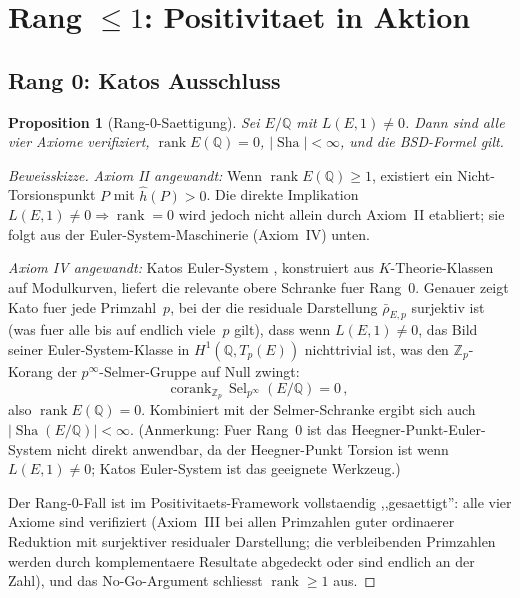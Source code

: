 \documentclass[aps,prd,twocolumn,superscriptaddress,nofootinbib]{revtex4-2}
\newtheorem{proposition}[theorem]{Proposition}
\theoremstyle{definition}
\theoremstyle{remark}
\DeclareMathOperator{\rank}{rank}
\DeclareMathOperator{\Sel}{Sel}
\DeclareMathOperator{\Sha}{Sha}
\begin{document}
\section{Rang $\leq 1$: Positivitaet in Aktion}
\label{sec:rank01}

\subsection{Rang 0: Katos Ausschluss}

\begin{proposition}[Rang-0-Saettigung]
\label{prop:rank0}
Sei $E/\mathbb{Q}$ mit $L(E,1) \neq 0$. Dann sind alle vier Axiome verifiziert, $\rank E(\mathbb{Q}) = 0$, $|\Sha| < \infty$, und die BSD-Formel gilt.
\end{proposition}

\begin{proof}[Beweisskizze]
\textit{Axiom II angewandt:} Wenn $\rank E(\mathbb{Q}) \geq 1$, existiert ein Nicht-Torsionspunkt $P$ mit $\hat{h}(P) > 0$. Die direkte Implikation $L(E,1) \neq 0 \Rightarrow \rank = 0$ wird jedoch nicht allein durch Axiom~II etabliert; sie folgt aus der Euler-System-Maschinerie (Axiom~IV) unten.

\textit{Axiom IV angewandt:} Katos Euler-System \cite{Kato2004}, konstruiert aus $K$-Theorie-Klassen auf Modulkurven, liefert die relevante obere Schranke fuer Rang~0. Genauer zeigt Kato fuer jede Primzahl~$p$, bei der die residuale Darstellung $\bar{\rho}_{E,p}$ surjektiv ist (was fuer alle bis auf endlich viele~$p$ gilt), dass wenn $L(E,1) \neq 0$, das Bild seiner Euler-System-Klasse in $H^1(\mathbb{Q}, T_p(E))$ nichttrivial ist, was den $\mathbb{Z}_p$-Korang der $p^\infty$-Selmer-Gruppe auf Null zwingt:
\begin{equation}
\mathrm{corank}_{\mathbb{Z}_p}\, \Sel_{p^\infty}(E/\mathbb{Q}) = 0\,,
\end{equation}
also $\rank E(\mathbb{Q}) = 0$. Kombiniert mit der Selmer-Schranke ergibt sich auch $|\Sha(E/\mathbb{Q})| < \infty$. (Anmerkung: Fuer Rang~0 ist das Heegner-Punkt-Euler-System nicht direkt anwendbar, da der Heegner-Punkt Torsion ist wenn $L(E,1) \neq 0$; Katos Euler-System ist das geeignete Werkzeug.)

Der Rang-0-Fall ist im Positivitaets-Framework vollstaendig ,,gesaettigt'': alle vier Axiome sind verifiziert (Axiom~III bei allen Primzahlen guter ordinaerer Reduktion mit surjektiver residualer Darstellung; die verbleibenden Primzahlen werden durch komplementaere Resultate abgedeckt oder sind endlich an der Zahl), und das No-Go-Argument schliesst $\rank \geq 1$ aus.
\end{proof}
\end{document}
